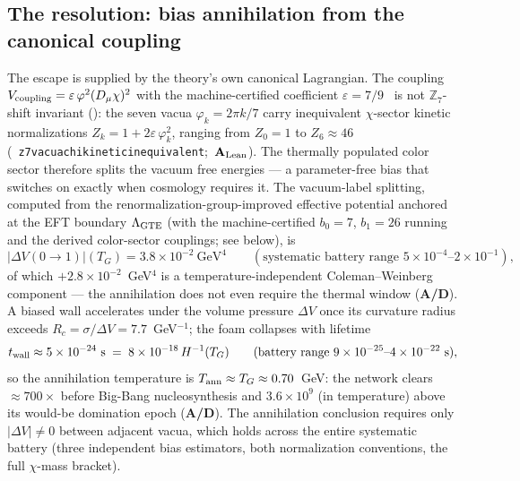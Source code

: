 \documentclass[11pt]{article}
\theoremstyle{remark}
\newcommand{\ZS}{\mathbb{Z}_7}
\newcommand{\lean}[1]{%
  \penalty-100
  \begingroup\def\_{\textunderscore\allowbreak}\texttt{#1}\endgroup}
\newcommand{\CatAL}{\ensuremath{\textbf{A}_{\rm Lean}}}
\newcommand{\CatAD}{\textbf{A/D}}
\begin{document}
\subsection{The resolution: bias annihilation from the canonical coupling}
\label{sec:defect-bias}

The escape is supplied by the theory's own canonical Lagrangian. The coupling
$V_{\rm coupling} = \varepsilon\,\varphi^2(D_\mu\chi)^2$ with the
machine-certified coefficient $\varepsilon = 7/9$~\cite{SpivackPhiMDLField} is
not $\ZS$-shift invariant (): the seven vacua
$\varphi_k = 2\pi k/7$ carry inequivalent $\chi$-sector kinetic normalizations
$Z_k = 1 + 2\varepsilon\,\varphi_k^2$, ranging from $Z_0 = 1$ to
$Z_6 \approx 46$ \mbox{(\lean{z7\_vacua\_chi\_kinetic\_inequivalent}; \CatAL)}.
The thermally populated color sector therefore splits the vacuum free energies
--- a parameter-free bias that switches on exactly when cosmology requires it.
The vacuum-label splitting, computed from the renormalization-group-improved
effective potential anchored at the EFT boundary $\Lambda_{\rm GTE}$ (with the
machine-certified $b_0 = 7$, $b_1 = 26$ running and the derived color-sector
couplings; see below), is
\begin{equation}
  |\Delta V(0\!\to\!1)|(T_G) = 3.8\times10^{-2}\ \text{GeV}^4
  \qquad (\text{systematic battery range } 5\times10^{-4}\text{--}2\times10^{-1}),
  \label{eq:wallbias}
\end{equation}
of which $+2.8\times10^{-2}$~GeV$^4$ is a temperature-independent
Coleman--Weinberg component --- the annihilation does not even require the
thermal window (\CatAD). A biased wall accelerates under the volume pressure
$\Delta V$ once its curvature radius exceeds $R_c = \sigma/\Delta V =
7.7$~GeV$^{-1}$; the foam collapses with lifetime
\begin{equation}
  t_{\rm wall} \approx 5\times10^{-24}\ \text{s}
  \;=\; 8\times10^{-18}\,H^{-1}(T_G)
  \qquad (\text{battery range } 9\times10^{-25}\text{--}4\times10^{-22}\ \text{s}),
\end{equation}
so the annihilation temperature is $T_{\rm ann} \approx T_G \approx 0.70$~GeV:
the network clears $\approx 700\times$ before Big-Bang nucleosynthesis and
$3.6\times10^{9}$ (in temperature) above its would-be domination epoch
(\CatAD). The annihilation conclusion requires only $|\Delta V| \neq 0$ between
adjacent vacua, which holds across the entire systematic battery (three
independent bias estimators, both normalization conventions, the full
$\chi$-mass bracket).
\end{document}
